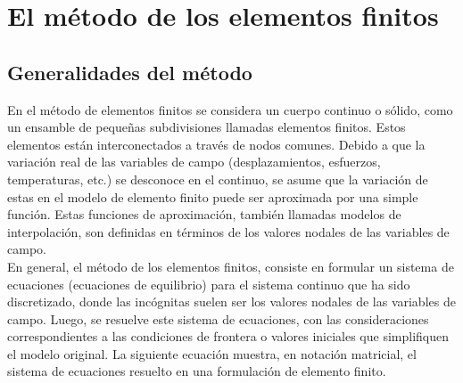 



\section{El método de los elementos finitos}

\subsection{Generalidades del método}

En el método de elementos finitos se considera un cuerpo continuo o sólido, como un ensamble de pequeñas subdivisiones llamadas elementos finitos. Estos elementos están interconectados a través de nodos comunes. Debido a que la variación real de las variables de campo (desplazamientos, esfuerzos, temperaturas, etc.) se desconoce en el continuo, se asume que la variación de estas en el modelo de elemento finito puede ser aproximada por una simple función. Estas funciones de aproximación, también llamadas modelos de interpolación, son definidas en términos de los valores nodales de las variables de campo.\\

En general, el método de los elementos finitos, consiste en formular un sistema de ecuaciones (ecuaciones de equilibrio) para el sistema continuo que ha sido discretizado, donde las incógnitas suelen ser los valores nodales de las variables de campo. Luego, se resuelve este sistema de ecuaciones, con las consideraciones correspondientes a las condiciones de frontera o valores iniciales que simplifiquen el modelo original. La siguiente ecuación muestra, en notación matricial, el sistema de ecuaciones resuelto en una formulación de elemento finito.

